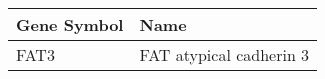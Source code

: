 \begin{tabular}{ll}
\toprule
Gene Symbol &                    Name \\
\midrule
       FAT3 & FAT atypical cadherin 3 \\
\bottomrule
\end{tabular}
